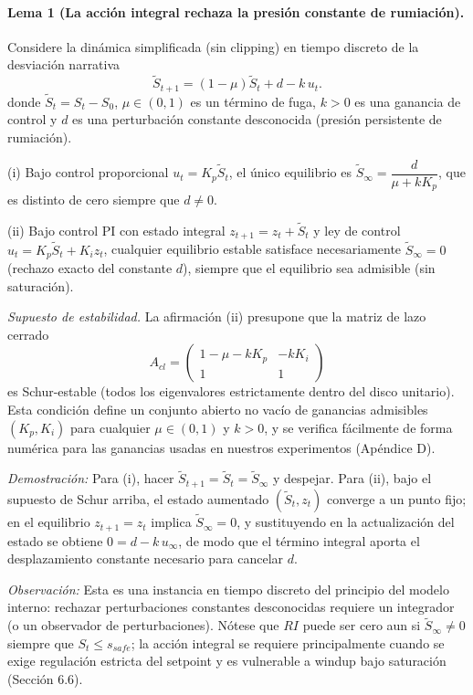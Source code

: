 \documentclass{article}
\begin{document}
\paragraph{Lema 1 (La acción integral rechaza la presión constante de rumiación).}
Considere la dinámica simplificada (sin clipping) en tiempo discreto de la desviación narrativa
\[
\tilde{S}_{t+1} = (1-\mu)\tilde{S}_t + d - k\,u_t .
\]
donde $\tilde{S}_t = S_t - S_0$, $\mu\in(0,1)$ es un término de fuga, $k>0$ es una ganancia de control y $d$ es una perturbación constante desconocida (presión persistente de rumiación).

(i) Bajo control proporcional $u_t = K_p\tilde{S}_t$, el único equilibrio es $\tilde{S}_\infty = \dfrac{d}{\mu + kK_p}$, que es distinto de cero siempre que $d\neq 0$.

(ii) Bajo control PI con estado integral $z_{t+1}=z_t + \tilde{S}_t$ y ley de control $u_t = K_p\tilde{S}_t + K_i z_t$, cualquier equilibrio estable satisface necesariamente $\tilde{S}_\infty = 0$ (rechazo exacto del constante $d$), siempre que el equilibrio sea admisible (sin saturación).

\textit{Supuesto de estabilidad.} La afirmación (ii) presupone que la matriz de lazo cerrado
\[
A_{cl} = \begin{pmatrix} 1-\mu-kK_p & -kK_i \\ 1 & 1 \end{pmatrix}
\]
es Schur-estable (todos los eigenvalores estrictamente dentro del disco unitario). Esta condición define un conjunto abierto no vacío de ganancias admisibles $(K_p, K_i)$ para cualquier $\mu\in(0,1)$ y $k>0$, y se verifica fácilmente de forma numérica para las ganancias usadas en nuestros experimentos (Apéndice D).

\textit{Demostración:} Para (i), hacer $\tilde{S}_{t+1}=\tilde{S}_t=\tilde{S}_\infty$ y despejar. Para (ii), bajo el supuesto de Schur arriba, el estado aumentado $(\tilde{S}_t, z_t)$ converge a un punto fijo; en el equilibrio $z_{t+1}=z_t$ implica $\tilde{S}_\infty=0$, y sustituyendo en la actualización del estado se obtiene $0=d-k\,u_\infty$, de modo que el término integral aporta el desplazamiento constante necesario para cancelar $d$.

\textit{Observación:} Esta es una instancia en tiempo discreto del principio del modelo interno: rechazar perturbaciones constantes desconocidas requiere un integrador (o un observador de perturbaciones). Nótese que $RI$ puede ser cero aun si $\tilde{S}_\infty\neq 0$ siempre que $S_t \le s_{safe}$; la acción integral se requiere principalmente cuando se exige regulación estricta del setpoint y es vulnerable a windup bajo saturación (Sección 6.6).
\end{document}
